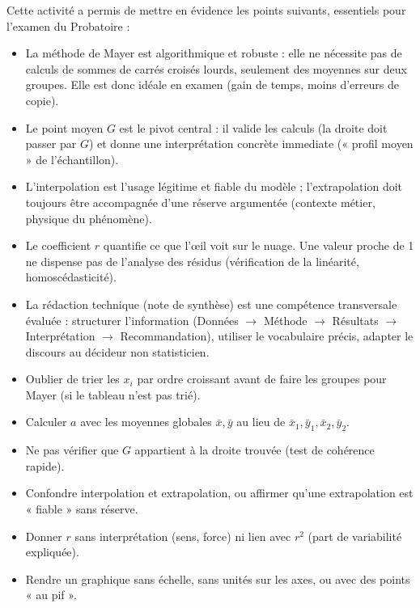 \documentclass[11pt]{article}
\newcommand{\cle}[1]{{\popxbold\color{popdark}#1}}
\newcounter{popsec}
\newcounter{popsub}
\newcommand{\courssub}[1]{%
  \stepcounter{popsub}%
  \par\vspace{9pt}\noindent{\popxbold\fontsize{11.5}{13}\selectfont\color{popink}{\color{poporange}\thepopsec.\thepopsub}\hspace{6pt}#1}\par\nopagebreak\vspace{4pt}
}
\begin{document}
\courssub{Bilan de l'activité}
Cette activité a permis de mettre en évidence les points suivants, essentiels pour l'examen du Probatoire :
\begin{itemize}
    \item La \cle{méthode de Mayer} est algorithmique et robuste : elle ne nécessite pas de calculs de sommes de carrés croisés lourds, seulement des moyennes sur deux groupes. Elle est donc idéale en examen (gain de temps, moins d'erreurs de copie).
    \item Le \cle{point moyen $G$} est le pivot central : il valide les calculs (la droite doit passer par $G$) et donne une interprétation concrète immediate (« profil moyen » de l'échantillon).
    \item L'\cle{interpolation} est l'usage légitime et fiable du modèle ; l'\cle{extrapolation} doit toujours être accompagnée d'une réserve argumentée (contexte métier, physique du phénomène).
    \item Le \cle{coefficient $r$} quantifie ce que l'œil voit sur le nuage. Une valeur proche de 1 ne dispense pas de l'analyse des résidus (vérification de la linéarité, homoscédasticité).
    \item La \cle{rédaction technique} (note de synthèse) est une compétence transversale évaluée : structurer l'information (Données $\rightarrow$ Méthode $\rightarrow$ Résultats $\rightarrow$ Interprétation $\rightarrow$ Recommandation), utiliser le vocabulaire précis, adapter le discours au décideur non statisticien.
\end{itemize}
\begin{attention}
\begin{itemize}
    \item Oublier de trier les $x_i$ par ordre croissant avant de faire les groupes pour Mayer (si le tableau n'est pas trié).
    \item Calculer $a$ avec les moyennes globales $\bar{x}, \bar{y}$ au lieu de $\bar{x}_1, \bar{y}_1, \bar{x}_2, \bar{y}_2$.
    \item Ne pas vérifier que $G$ appartient à la droite trouvée (test de cohérence rapide).
    \item Confondre interpolation et extrapolation, ou affirmer qu'une extrapolation est « fiable » sans réserve.
    \item Donner $r$ sans interprétation (sens, force) ni lien avec $r^2$ (part de variabilité expliquée).
    \item Rendre un graphique sans échelle, sans unités sur les axes, ou avec des points « au pif ».
\end{itemize}
\end{attention}
\end{document}

